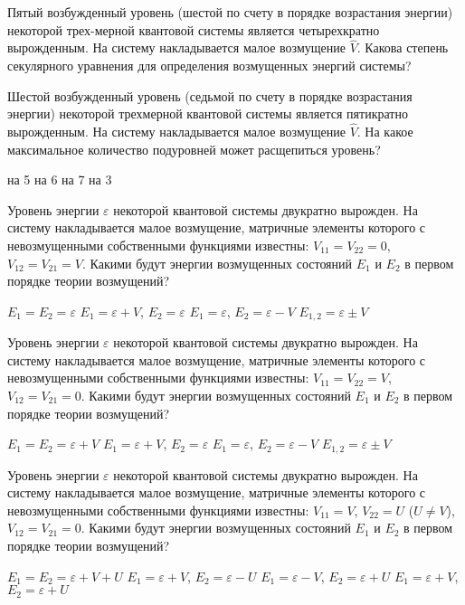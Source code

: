 \documentclass[11pt,a4paper]{exam}
\begin{document}
\begin{questions}
\question Пятый возбужденный уровень (шестой по счету в порядке возрастания энергии) некоторой трех-мерной квантовой системы является четырехкратно вырожденным. На систему накладывается малое возмущение $\hat V$. Какова степень секулярного уравнения для определения возмущенных энергий системы?
\begin{choices}
\end{choices}

\question Шестой возбужденный уровень (седьмой по счету в порядке возрастания энергии) некоторой трехмерной квантовой системы является пятикратно вырожденным. На систему накладывается малое возмущение $\hat V$. На какое максимальное количество подуровней может расщепиться уровень?
\begin{choices}
\choice на 5     
\choice на 6     
\choice на 7     
\choice на 3
\end{choices}

\question Уровень энергии $\varepsilon $ некоторой квантовой системы двукратно вырожден. На систему накладывается малое возмущение, матричные элементы которого с невозмущенными собственными функциями известны: ${V_{11}} = {V_{22}} = 0$, ${V_{12}} = {V_{21}} = V$. Какими будут энергии возмущенных состояний ${E_1}$ и ${E_2}$ в первом порядке теории возмущений?
\begin{choices}
\choice ${E_1} = {E_2} = \varepsilon $   
\choice ${E_1} = \varepsilon  + V$, ${E_2} = \varepsilon $    
\choice ${E_1} = \varepsilon $, ${E_2} = \varepsilon  - V$    
\choice ${E_{1,2}} = \varepsilon  \pm V$
\end{choices}

\question Уровень энергии $\varepsilon $ некоторой квантовой системы двукратно вырожден. На систему накладывается малое возмущение, матричные элементы которого с невозмущенными собственными функциями известны: ${V_{11}} = {V_{22}} = V$, ${V_{12}} = {V_{21}} = 0$. Какими будут энергии возмущенных состояний ${E_1}$ и ${E_2}$ в первом порядке теории возмущений?
\begin{choices}
\choice ${E_1} = {E_2} = \varepsilon  + V$  
\choice ${E_1} = \varepsilon  + V$, ${E_2} = \varepsilon $    
\choice ${E_1} = \varepsilon $, ${E_2} = \varepsilon  - V$    
\choice ${E_{1,2}} = \varepsilon  \pm V$
\end{choices}

\question Уровень энергии $\varepsilon $ некоторой квантовой системы двукратно вырожден. На систему накладывается малое возмущение, матричные элементы которого с невозмущенными собственными функциями известны: ${V_{11}} = V$, ${V_{22}} = U$ ($U \ne V$), ${V_{12}} = {V_{21}} = 0$. Какими будут энергии возмущенных состояний ${E_1}$ и ${E_2}$ в первом порядке теории возмущений?
\begin{choices}
\choice ${E_1} = {E_2} = \varepsilon  + V + U$    
\choice ${E_1} = \varepsilon  + V$, ${E_2} = \varepsilon  - U$
\choice ${E_1} = \varepsilon  - V$, ${E_2} = \varepsilon  + U$      
\choice ${E_1} = \varepsilon  + V$, ${E_2} = \varepsilon  + U$
\end{choices}


\end{questions}
\end{document}
